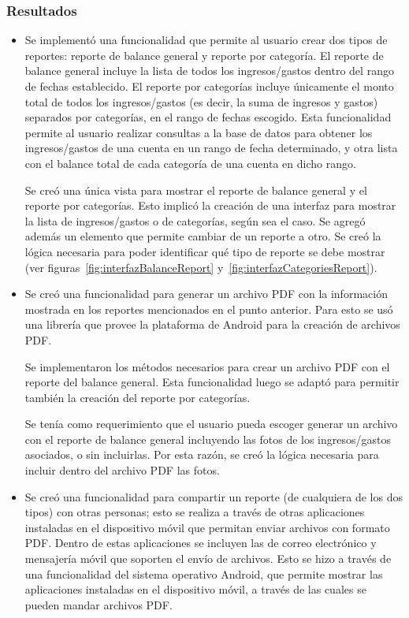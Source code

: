 \subsubsection{Resultados}
\begin{itemize}
\item Se implementó una funcionalidad que permite al usuario crear dos tipos de reportes: reporte de balance general y reporte por categoría. El reporte de balance general incluye la lista de todos los ingresos/gastos dentro del rango de fechas establecido. El reporte por categorías incluye únicamente el monto total de todos los ingresos/gastos (es decir, la suma de ingresos y gastos) separados por categorías, en el rango de fechas escogido. Esta funcionalidad permite al usuario realizar consultas a la base de datos para obtener los ingresos/gastos de una cuenta en un rango de fecha determinado, y otra lista con el balance total de cada categoría de una cuenta en dicho rango.

Se creó una única vista para mostrar el reporte de balance general y el reporte por categorías. Esto implicó la creación de una interfaz para mostrar la lista de ingresos/gastos o de categorías, según sea el caso. Se agregó además un elemento que permite cambiar de un reporte a otro. Se creó la lógica necesaria para poder identificar qué tipo de reporte se debe mostrar (ver figuras~\ref{fig:interfazBalanceReport} y~\ref{fig:interfazCategoriesReport}).
\item Se creó una funcionalidad para generar un archivo PDF con la información mostrada en los reportes mencionados en el punto anterior.  Para esto se usó una librería que provee la plataforma de Android para la creación de archivos PDF.  

Se implementaron los métodos necesarios para crear un archivo PDF con el reporte del balance general. Esta funcionalidad luego se adaptó para permitir también la creación del reporte por categorías. %

Se tenía como requerimiento que el usuario pueda escoger generar un archivo con el reporte de balance general incluyendo las fotos de los ingresos/gastos asociados, o sin incluirlas. Por esta razón, se creó la lógica necesaria para incluir dentro del archivo PDF las fotos.
\item Se creó una funcionalidad para compartir un reporte (de cualquiera de los dos tipos) con otras personas; esto se realiza a través de otras aplicaciones instaladas en el dispositivo móvil que permitan enviar archivos con formato PDF. Dentro de estas aplicaciones se incluyen las de correo electrónico y mensajería móvil que soporten el envío de archivos. Esto se hizo a través de una funcionalidad del sistema operativo Android, que permite mostrar las aplicaciones instaladas en el dispositivo móvil, a través de las cuales se pueden mandar archivos PDF.
\end{itemize}
